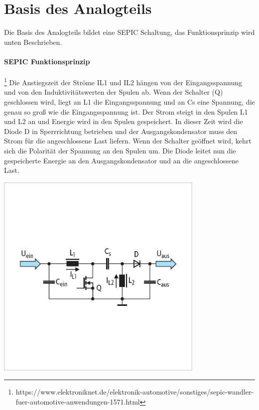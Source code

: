 \documentclass[paper=a4, 12pt]{scrreprt}
\begin{document}
	\section{Basis des Analogteils}
	Die Basis des Analogteils bildet eine SEPIC Schaltung, das Funktionsprinzip wird unten Beschrieben.
	\paragraph{SEPIC Funktionsprinzip}\footnote{https://www.elektroniknet.de/elektronik-automotive/sonstiges/sepic-wandler-fuer-automotive-anwendungen-1571.html}\hfill \break
	Die Anstiegszeit der Ströme IL1 und IL2 hängen von der Eingangsspannung und von den Induktivitätswerten der Spulen ab. Wenn der Schalter (Q) geschlossen wird, liegt an L1 die Eingangsspannung und an Cs eine Spannung, die genau so groß wie die Eingangsspannung ist. Der Strom steigt in den Spulen L1 und L2 an und Energie wird in den Spulen gespeichert. In dieser Zeit wird die Diode D in Sperrrichtung betrieben und der Ausgangskondensator muss den Strom für die angeschlossene Last liefern. Wenn der Schalter geöffnet wird, kehrt sich die Polarität der Spannung an den Spulen um. Die Diode leitet nun die gespeicherte Energie an den Ausgangskondensator und an die angeschlossene Last.
	\begin{adjustbox}{center,caption={Prinzipschaltung eines SEPIC-Converters},label={fig:SEPIC-Prinzipschaltung},nofloat=figure,vspace=\bigskipamount}
		\includegraphics[height=10cm]{img/SEPIC_PRinzipschaltung.jpg}
	\hfill \break
	\end{adjustbox}
	\pagebreak
\end{document}
